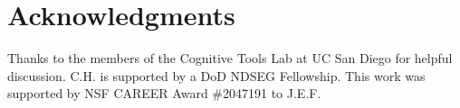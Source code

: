 \documentclass[10pt,letterpaper]{article}
\begin{document}


\section{Acknowledgments}

Thanks to the members of the Cognitive Tools Lab at UC San Diego for helpful discussion. C.H. is supported by a DoD NDSEG Fellowship. This work was supported by NSF CAREER Award \#2047191 to J.E.F.


\vspace{2em}
\vspace{2em} \noindent



\setlength{\bibleftmargin}{.125in}
\setlength{\bibindent}{-\bibleftmargin}


\end{document}
